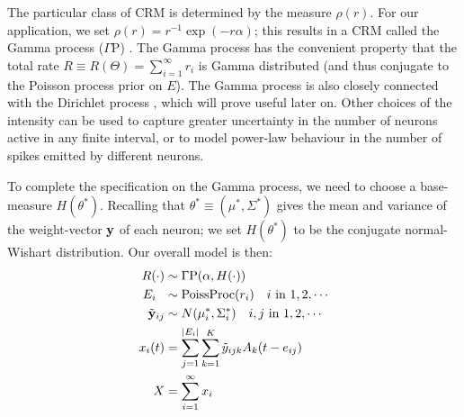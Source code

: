 The particular class of CRM is determined by the \Levy measure $\rho(r)$. For our application, we set $\rho(r) = r^{-1}\exp(-r\alpha)$;
this results in a CRM called the Gamma process ($\Gamma$P) \citep{applebaum2004}. 
The Gamma process has the convenient property that the 
total rate $R \equiv R(\Theta) = \sum_{i=1}^{\infty} r_i$ is Gamma distributed (and thus conjugate to the Poisson process prior on $E$).
The Gamma process is also closely connected with the Dirichlet process \citep{Ferguson73}, which will prove useful
later on.
Other choices of the \Levy intensity can be used to capture greater uncertainty in the number of neurons active in any finite interval, or to model
power-law behaviour in the number of spikes emitted by different neurons.

To complete the specification on the Gamma process, we need to choose a base-measure $H(\theta^*)$.
Recalling that $\theta^* \equiv (\mu^*, \Sigma^*)$ gives the mean and variance of the weight-vector $\mathbf{y}$ of each neuron; we set $H(\theta^*)$ 
to be the conjugate normal-Wishart distribution. Our overall model is then:
\begin{align}
  R(\cdot) & \sim \Gamma \text{P}(\alpha, H(\cdot)) \\ %
  E_i\ \  &\sim \text{PoissProc}(r_i) \quad i \text{ in } 1,2,\cdots \\
  \tilde{\by}_{ij} & \sim N(\mu^*_i, \Sigma^*_i) \quad i,j \text{ in } 1,2,\cdots \\
  x_i(t) &= \sum_{j = 1}^{|E_i|}  \sum_{k = 1}^{K} \tilde{y}_{ijk} A_k(t - e_{ij}) \\
  X   &= \sum_{i=1}^{\infty} x_i
\end{align}


